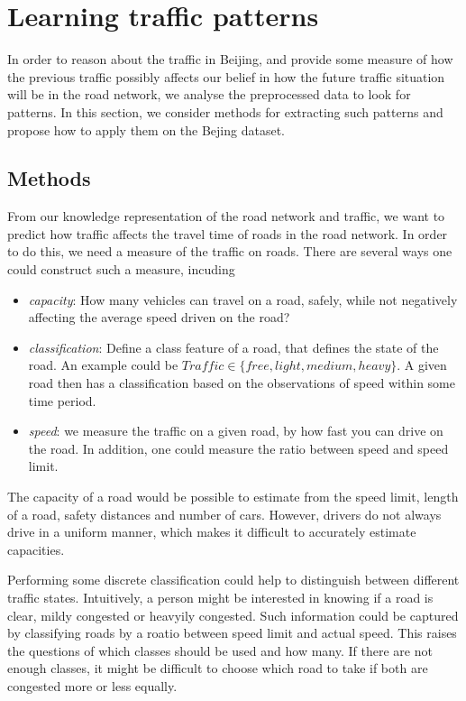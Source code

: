 \section{Learning traffic patterns}\label{traffic-patterns}
In order to reason about the traffic in Beijing, and provide some measure of how the previous traffic possibly affects our belief in how the future traffic situation will be in the road network, we analyse the preprocessed data to look for patterns. In this section, we consider methods for extracting such patterns and propose how to apply them on the Bejing dataset.
\subsection{Methods}\label{patterns:methods}
From our knowledge representation of the road network and traffic, we want to predict how traffic affects the travel time of roads in the road network. In order to do this, we need a measure of the traffic on roads. There are several ways one could construct such a measure, incuding
\begin{itemize}
\item \emph{capacity}: How many vehicles can travel on a road, safely, while not negatively affecting the average speed driven on the road?
\item \emph{classification}: Define a class feature of a road, that defines the state of the road. An example could be $Traffic \in \{free, light, medium, heavy\}$. A given road then has a classification based on the observations of speed within some time period.
\item \emph{speed}: we measure the traffic on a given road, by how fast you can drive on the road. In addition, one could measure the ratio between speed and speed limit.
\end{itemize}
The capacity of a road would be possible to estimate from the speed limit, length of a road, safety distances and number of cars. However, drivers do not always drive in a uniform manner, which makes it difficult to accurately estimate capacities.\par
Performing some discrete classification could help to distinguish between different traffic states. Intuitively, a person might be interested in knowing if a road is clear, mildy congested or heavyily congested. Such information could be captured by classifying roads by a roatio between speed limit and actual speed. This raises the questions of which classes should be used and how many. If there are not enough classes, it might be difficult to choose which road to take if both are congested more or less equally.\par

